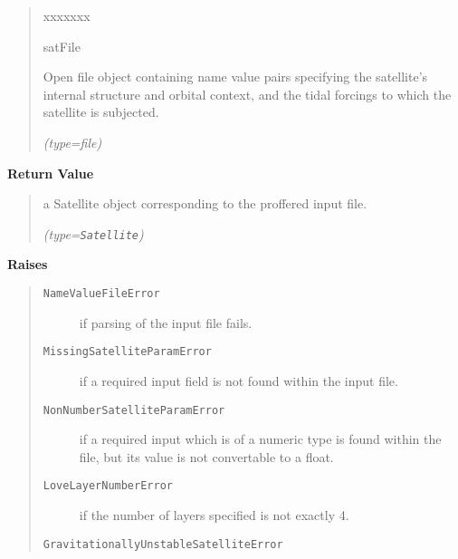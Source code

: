 \begin{boxedminipage}{\funcwidth}
      \begin{quote}
        \begin{Ventry}{xxxxxxx}

          \item[satFile]

          Open file object containing name value pairs specifying the 
          satellite's internal structure and orbital context, and the tidal
          forcings to which the satellite is subjected.

            {\it (type=file)}

        \end{Ventry}

      \end{quote}

      \textbf{Return Value}
    \vspace{-1ex}

      \begin{quote}
      a Satellite object corresponding to the proffered input file.

      {\it (type=\texttt{Satellite})}

      \end{quote}

      \textbf{Raises}
    \vspace{-1ex}

      \begin{quote}
        \begin{description}

          \item[\texttt{NameValueFileError}]

          if parsing of the input file fails.

          \item[\texttt{MissingSatelliteParamError}]

          if a required input field is not found within the input file.

          \item[\texttt{NonNumberSatelliteParamError}]

          if a required input which is of a numeric type is found within 
          the file, but its value is not convertable to a float.

          \item[\texttt{LoveLayerNumberError}]

          if the number of layers specified is not exactly 4.

          \item[\texttt{GravitationallyUnstableSatelliteError}]


\end{description}
\end{quote}
\end{boxedminipage}

